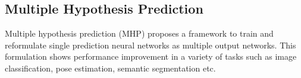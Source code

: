 \subsection{Multiple Hypothesis Prediction}
Multiple hypothesis prediction (MHP) \cite{rupprecht2017iccv} proposes a framework to train and reformulate single prediction neural networks as multiple output networks.  This formulation shows performance improvement in a variety of tasks such as image classification, pose estimation, semantic segmentation etc.
